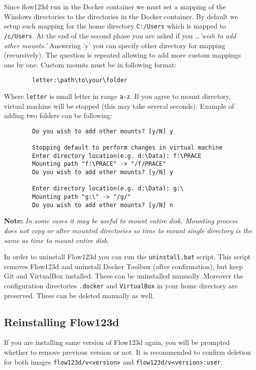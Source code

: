 \documentclass[12pt,a4paper]{report}
\begin{document}
\begin{enumerate}
	Since flow123d run in the Docker container we must set a mapping of the Windows directories to the directories in the Docker container. 
	By default we setup such mapping for the home directory \verb'C:/Users' which is mapped to \verb'/c/Users'. 
	At the end of the second phase you are asked if you \dots \emph{'wish to add other mounts.'} Answering 'y' you can specify other directory for mapping 
	(recursively). The question is repeated allowing to add more custom mappings one by one. Custom mounts must be in following format:
	\begin{verbatim}
		letter:\path\to\your\folder
	\end{verbatim}
	Where \verb'letter' is small letter in range \verb'a-z'. If you agree to mount directory, virtual machine will be stopped 
	(this may take several seconds). Example of adding two folders can be following:
	\begin{verbatim}
		Do you wish to add other mounts? [y/N] y
		
		Stopping default to perform changes in virtual machine
		Enter directory location(e.g. d:\Data): f:\PRACE
		Mounting path "f:\PRACE" -> "/f/PRACE"
		Do you wish to add other mounts? [y/N] y
		
		Enter directory location(e.g. d:\Data): g:\
		Mounting path "g:\" -> "/g/"
		Do you wish to add other mounts? [y/N] n
	\end{verbatim}
	
	\textbf{Note:}
	\textit{In some cases it may be useful to mount entire disk. Mounting process does not copy or alter mounted directories so
	time to mount single directory is the same as time to mount entire disk.}
\end{enumerate}

In order to uninstall Flow123d you can run the \verb'uninstall.bat' script. This script removes Flow123d 
and uninstall Docker Toolbox (after confirmation), but keep Git and VirtualBox installed. These can be uninstalled manually. 
Moreover the configuration directories \verb'.docker' and \verb'VirtualBox' in your home directory are preserved. These can be deleted manually as well. 

\subsection{Reinstalling Flow123d}
\label{duplicit-image}
If you are installing same version of Flow123d again, you will be prompted whether to remove previous version or not. 
It is recommended to confirm deletion for both images \verb'flow123d/v<version>' and \verb'flow123d/v<version>:user'.
\end{document}
